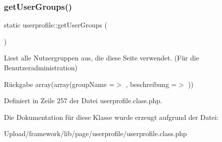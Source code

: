 \subsubsection{\texorpdfstring{get\+User\+Groups()}{getUserGroups()}}
{\footnotesize\ttfamily static userprofile\+::get\+User\+Groups (\begin{DoxyParamCaption}{ }\end{DoxyParamCaption})\hspace{0.3cm}{\ttfamily [static]}}

Liest alle Nutzergruppen aus, die diese Seite verwendet. (Für die Benutzeradministration) \begin{DoxyReturn}{Rückgabe}
array(array(\textquotesingle{}group\+Name\textquotesingle{} =$>$ \textquotesingle{}\textquotesingle{}, \textquotesingle{}beschreibung\textquotesingle{} =$>$ \textquotesingle{}\textquotesingle{})) 
\end{DoxyReturn}


Definiert in Zeile 257 der Datei userprofile.\+class.\+php.



Die Dokumentation für diese Klasse wurde erzeugt aufgrund der Datei\+:\begin{DoxyCompactItemize}
\item 
Upload/framework/lib/page/userprofile/userprofile.\+class.\+php\end{DoxyCompactItemize}
